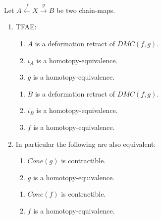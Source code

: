 \documentclass[fontsize=11pt,fleqn,a4paper]{scrartcl}
\begin{document}
\begin{theorem}
Let $A\xleftarrow{f}X\xrightarrow{g} B$ be two chain-maps.
\begin{enumerate}
\item TFAE:

\begin{minipage}{0.49\linewidth}
\begin{enumerate}
\item $A$ is a deformation retract of $DMC(f,g)$.
\item $i_A$ is a homotopy-equivalence.
\item $g$ is a homotopy-equivalence.
\end{enumerate}
\end{minipage} \hfill \begin{minipage}{0.49\linewidth}
\begin{enumerate}
\item $B$ is a deformation retract of $DMC(f,g)$.
\item $i_B$ is a homotopy-equivalence.
\item $f$ is a homotopy-equivalence.
\end{enumerate}
\end{minipage}

\item In particular the following are also equivalent:

\begin{minipage}{0.49\linewidth}
\begin{enumerate}
\item $Cone(g)$ is contractible.
\item $g$ is a homotopy-equivalence.
\end{enumerate}
\end{minipage} \hfill \begin{minipage}{0.49\linewidth}
\begin{enumerate}
\item $Cone(f)$ is contractible.
\item $f$ is a homotopy-equivalence.
\end{enumerate}
\end{minipage}

\end{enumerate}
\end{theorem}
\end{document}

